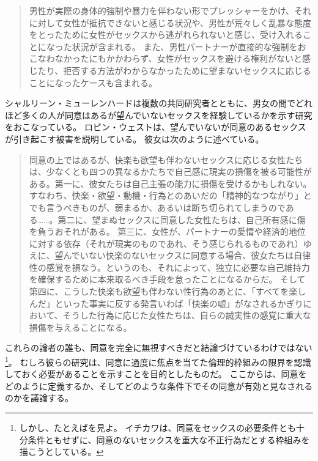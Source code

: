 \documentclass[paper=a4,book,openany]{jlreq} \usepackage{mystyle}
\begin{document}
\begin{quote}
男性が実際の身体的強制や暴力を伴わない形でプレッシャーをかけ、それに対して女性が抵抗できないと感じる状況や、男性が荒々しく乱暴な態度をとったために女性がセックスから逃がれられないと感じ、受け入れることになった状況が含まれる。
また、男性パートナーが直接的な強制をおこなわなかったにもかかわらず、女性がセックスを避ける権利がないと感じたり、拒否する方法がわからなかったために望まないセックスに応じることになったケースも含まれる。
\citep[p.136]{gavey04:_just_sex}
\end{quote}

シャルリーン・ミューレンハードは複数の共同研究者とともに、男女の間でどれほど多くの人が同意はあるが望んでいないセックスを経験しているかを示す研究をおこなっている\citep[cf.][]{muehlenhard05:_wantin_not_wantin_sex,peterson07:_concep_wanted_women_consen_noncon_sexual_exper}。
ロビン・ウェストは、望んでいないが同意のあるセックスが引き起こす被害を説明している。
彼女は次のように述べている。

\begin{quote}
同意の上ではあるが、快楽も欲望も伴わないセックスに応じる女性たちは、少なくとも四つの異なるかたちで自己感に現実の損傷を被る可能性がある。第一に、彼女たちは自己主張の能力に損傷を受けるかもしれない。すなわち、快楽・欲望・動機・行為とのあいだの「精神的なつながり」とでも言うべきものが、弱まるか、あるいは断ち切られてしまうのである……。第二に、望まぬセックスに同意した女性たちは、自己所有感に傷を負うおそれがある。
第三に、女性が、パートナーの愛情や経済的地位に対する依存（それが現実のものであれ、そう感じられるものであれ）ゆえに、望んでいない快楽のないセックスに同意する場合、彼女たちは自律性の感覚を損なう。というのも、それによって、独立に必要な自己維持力を確保するために本来取るべき手段を怠ったことになるからだ。
そして第四に、こうした快楽も欲望も伴わない性行為のあとに、「すべてを楽しんだ」といった事実に反する発言{\DDASH}いわば「快楽の嘘」{\DDASH}がなされるかぎりにおいて、そうした行為に応じた女性たちは、自らの誠実性の感覚に重大な損傷を与えることになる。\citep[p.53]{west95:_harms_of_consen_sex}
\end{quote}

これらの論者の誰も、同意を完全に無視すべきだと結論づけているわけではない\footnote{しかし、たとえば\citet{ichikawa20:_presup_consen}を見よ。
イチカワは、同意をセックスの必要条件とも十分条件ともせずに、同意のないセックスを重大な不正行為だとする枠組みを描こうとしている。
\nocite{ichikawa20:_presup_consen}}。
むしろ彼らの研究は、同意に過度に焦点を当てた倫理的枠組みの限界を認識しておく必要があることを示すことを目的としたものだ。
ここからは、同意をどのように定義するか、そしてどのような条件下でその同意が有効と見なされるのかを議論する。
\end{document}
